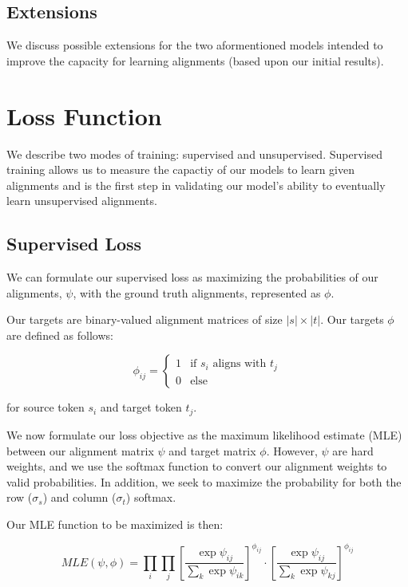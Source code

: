 \documentclass[twoside,twocolumn]{article}
\begin{document}
\subsection{Extensions}
We discuss possible extensions for the two aformentioned models intended
to improve the capacity for learning alignments (based upon our initial
results).

\section{Loss Function}
We describe two modes of training: supervised and unsupervised.
Supervised training allows us to measure the capactiy of our models
to learn given alignments and is the first step in validating our
model's ability to eventually learn unsupervised alignments.

\subsection{Supervised Loss}
We can formulate our supervised loss as maximizing the probabilities
of our alignments, $\psi$, with the ground truth alignments,
represented as $\phi$.

Our targets are binary-valued alignment matrices of size $|s| \times |t|$.
Our targets $\phi$ are defined as follows:

\begin{equation}
  \phi_{ij} = \begin{cases}
  1 & \text{if } s_i \text{ aligns with } t_j \\
  0 & \text{else}
  \end{cases}
\end{equation}

\noindent for source token $s_i$ and target token $t_j$.

We now formulate our loss objective as the maximum likelihood estimate (MLE)
between our alignment matrix $\psi$ and target matrix $\phi$.
However, $\psi$ are hard weights, and we use the softmax function to
convert our alignment weights to valid probabilities. In addition, we
seek to maximize the probability for both the row ($\sigma_s$) and
column ($\sigma_t$) softmax.

Our MLE function to be maximized is then:

\begin{equation}
  MLE(\psi, \phi) = \prod_i \prod_j \left[ \frac{\exp \psi_{ij}}{\sum_k \exp \psi_{ik}} \right]^{\phi_{ij}} \cdot \left[ \frac{\exp \psi_{ij}}{\sum_k \exp \psi_{kj}} \right]^{\phi_{ij}}
\end{equation}
\end{document}
